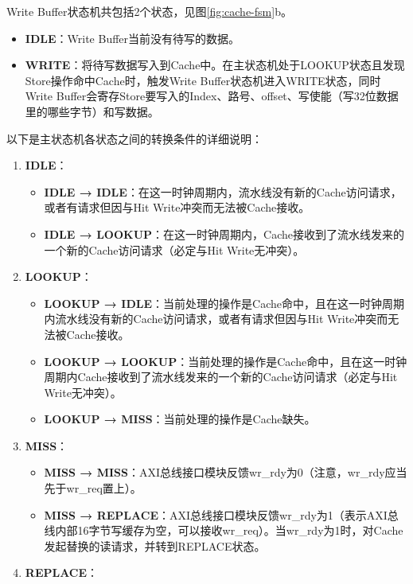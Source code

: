 Write Buffer状态机共包括2个状态，见图\ref{fig:cache-fsm}b。

\begin{itemize}
\tightlist
\item
  \textbf{IDLE}：Write Buffer当前没有待写的数据。
\item
  \textbf{WRITE}：将待写数据写入到Cache中。在主状态机处于LOOKUP状态且发现Store操作命中Cache时，触发Write Buffer状态机进入WRITE状态，同时Write Buffer会寄存Store要写入的Index、路号、offset、写使能（写32位数据里的哪些字节）和写数据。
\end{itemize}

以下是主状态机各状态之间的转换条件的详细说明：

\begin{enumerate}
\def\labelenumi{\arabic{enumi}.}
\tightlist
\item
  \textbf{IDLE}：

  \begin{itemize}
  \tightlist
  \item
    \textbf{IDLE → IDLE}：在这一时钟周期内，流水线没有新的Cache访问请求，或者有请求但因与Hit Write冲突而无法被Cache接收。
  \item
    \textbf{IDLE → LOOKUP}：在这一时钟周期内，Cache接收到了流水线发来的一个新的Cache访问请求（必定与Hit Write无冲突）。
  \end{itemize}
\item
  \textbf{LOOKUP}：

  \begin{itemize}
  \tightlist
  \item
    \textbf{LOOKUP → IDLE}：当前处理的操作是Cache命中，且在这一时钟周期内流水线没有新的Cache访问请求，或者有请求但因与Hit Write冲突而无法被Cache接收。
  \item
    \textbf{LOOKUP → LOOKUP}：当前处理的操作是Cache命中，且在这一时钟周期内Cache接收到了流水线发来的一个新的Cache访问请求（必定与Hit Write无冲突）。
  \item
    \textbf{LOOKUP → MISS}：当前处理的操作是Cache缺失。
  \end{itemize}
\item
  \textbf{MISS}：

  \begin{itemize}
  \tightlist
  \item
    \textbf{MISS → MISS}：AXI总线接口模块反馈wr\_rdy为0（注意，wr\_rdy应当先于wr\_req置上）。
  \item
    \textbf{MISS → REPLACE}：AXI总线接口模块反馈wr\_rdy为1（表示AXI总线内部16字节写缓存为空，可以接收wr\_req）。当wr\_rdy为1时，对Cache发起替换的读请求，并转到REPLACE状态。
  \end{itemize}
\item
  \textbf{REPLACE}：


\end{enumerate}
